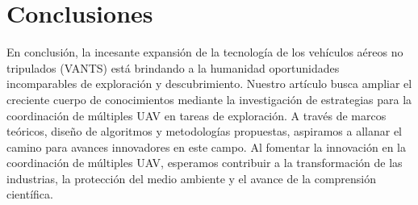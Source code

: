 \documentclass[sigconf]{acmart}
\begin{document}










\section{Conclusiones}

En conclusión, la incesante expansión de la tecnología de los vehículos aéreos no tripulados (VANTS) está brindando a la humanidad oportunidades incomparables de exploración y descubrimiento. Nuestro artículo busca ampliar el creciente cuerpo de conocimientos mediante la investigación de estrategias para la coordinación de múltiples UAV en tareas de exploración. A través de marcos teóricos, diseño de algoritmos y metodologías propuestas, aspiramos a allanar el camino para avances innovadores en este campo. Al fomentar la innovación en la coordinación de múltiples UAV, esperamos contribuir a la transformación de las industrias, la protección del medio ambiente y el avance de la comprensión científica.\\
\end{document}
